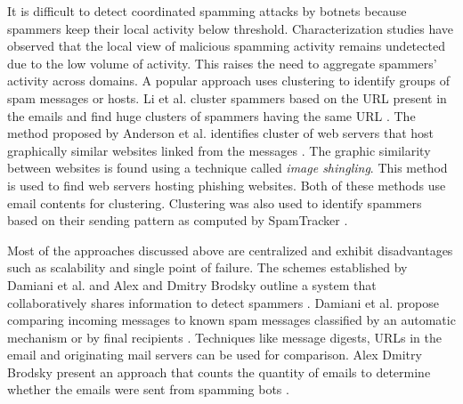It is difficult to detect coordinated spamming attacks by botnets because spammers keep their local activity below threshold.  Characterization studies \cite{sb} have observed that the local view of malicious spamming activity remains undetected due to the low volume of activity. This raises the need to aggregate spammers' activity across domains. A popular approach uses clustering to identify groups of spam messages or hosts. Li et al. cluster spammers based on the URL present in the emails and find huge clusters of spammers having the same URL \cite{cluster1}. The method proposed by Anderson et al. identifies cluster of web servers that host graphically similar websites linked from the messages \cite{spamscatter}. The graphic similarity between websites is found using a technique called \emph{image shingling}. This method is used to find web servers hosting phishing websites. Both of these methods use email contents for clustering. Clustering was also used to identify spammers based on their sending pattern as computed by SpamTracker \cite{bb}.

Most of the approaches discussed above \cite{bb,cluster1,spamscatter} are centralized and exhibit disadvantages such as scalability and single point of failure.  The schemes established by Damiani et al. and Alex and Dmitry Brodsky outline a system that collaboratively shares information to detect spammers \cite{sabrina04ppbased,trinity} . Damiani et al. propose comparing incoming messages to known spam messages classified by an automatic mechanism or by final recipients \cite{sabrina04ppbased}. Techniques like message digests, URLs in the email and originating mail servers can be used for comparison. Alex Dmitry Brodsky present an approach that counts the quantity of emails to determine whether the emails were sent from spamming bots \cite{trinity}.
